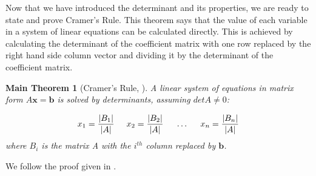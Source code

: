 \documentclass[11pt,reqno]{amsart}
\newtheorem*{maintheorem}{Main Theorem}
\theoremstyle{definition}
\begin{document}
Now that we have introduced the determinant and its properties, we are ready to state and prove Cramer’s Rule. This theorem says that the value of each variable in a system of linear equations can be calculated directly. This is achieved by calculating the determinant of the coefficient matrix with one row replaced by the right hand side column vector and dividing it by the determinant of the coefficient matrix. 

\begin{maintheorem}[{Cramer's Rule, \cite[5.3.4]{strang}}]
A linear system of equations in matrix form $A\mathbf{x}=\mathbf{b}$ is solved by determinants, assuming \(detA \neq 0\): 

\[x_1=\frac{|B_1|}{|A|}\hspace{0.5cm} x_2 = \frac{|B_2|}{|A|}\hspace{0.5cm} \dots\hspace{0.5cm}x_n = \frac{|B_n|}{|A|}\]
where $B_i$ is the matrix A with the $i^{th}$ column replaced by $\mathbf{b}$.
\end{maintheorem}

We follow the proof given in \cite[5.3]{strang}.
\end{document}
